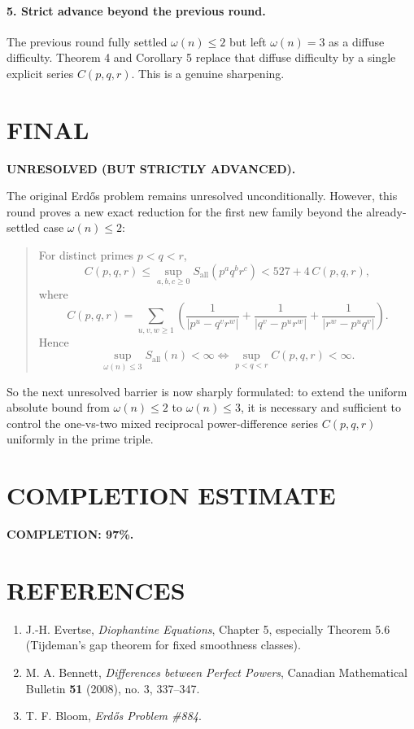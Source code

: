 \paragraph{5. Strict advance beyond the previous round.}
The previous round fully settled \(\omega(n)\le 2\) but left \(\omega(n)=3\) as a diffuse difficulty. Theorem 4 and Corollary 5 replace that diffuse difficulty by a single explicit series \(C(p,q,r)\). This is a genuine sharpening.

\section{FINAL}

\textbf{UNRESOLVED (BUT STRICTLY ADVANCED).}

The original Erd\H{o}s problem remains unresolved unconditionally. However, this round proves a new exact reduction for the first new family beyond the already-settled case \(\omega(n)\le 2\):

\begin{quote}
For distinct primes \(p<q<r\),
\[
C(p,q,r)\le \sup_{a,b,c\ge 0}S_{\mathrm{all}}(p^a q^b r^c)<527+4\,C(p,q,r),
\]
where
\[
C(p,q,r)=\sum_{u,v,w\ge 1}
\left(
\frac{1}{|p^u-q^v r^w|}
+\frac{1}{|q^v-p^u r^w|}
+\frac{1}{|r^w-p^u q^v|}
\right).
\]
Hence
\[
\sup_{\omega(n)\le 3} S_{\mathrm{all}}(n)<\infty
\iff
\sup_{p<q<r} C(p,q,r)<\infty.
\]
\end{quote}

So the next unresolved barrier is now sharply formulated: to extend the uniform absolute bound from \(\omega(n)\le 2\) to \(\omega(n)\le 3\), it is necessary and sufficient to control the one-vs-two mixed reciprocal power-difference series \(C(p,q,r)\) uniformly in the prime triple.

\section{COMPLETION ESTIMATE}

\noindent \textbf{COMPLETION: 97\%.}

\section{REFERENCES}

\begin{enumerate}
\item J.-H. Evertse, \emph{Diophantine Equations}, Chapter 5, especially Theorem 5.6 (Tijdeman's gap theorem for fixed smoothness classes).
\item M. A. Bennett, \emph{Differences between Perfect Powers}, Canadian Mathematical Bulletin \textbf{51} (2008), no. 3, 337--347.
\item T. F. Bloom, \emph{Erd\H{o}s Problem \#884}.
\end{enumerate}
